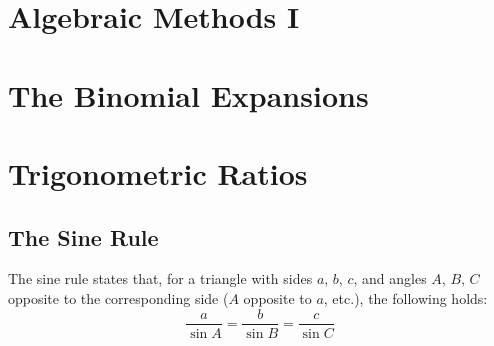 \section{Algebraic Methods I} \label{algebraic_methods_i}
\newpage

\section{The Binomial Expansions} \label{the_binomial_expansion}
\newpage

\section{Trigonometric Ratios} \label{trigonometric_ratios}
    \subsection{The Sine Rule}
        \begin{theorem} \label{thm:sine_rule}
            The sine rule states that, for a triangle with sides $a$, $b$, $c$, and angles $A$, $B$, $C$ opposite to the corresponding side ($A$ opposite to $a$, etc.), the following holds:
            \begin{equation}
                \frac{a}{\sin A}=\frac{b}{\sin B}=\frac{c}{\sin C}
            \end{equation}
        \end{theorem}
